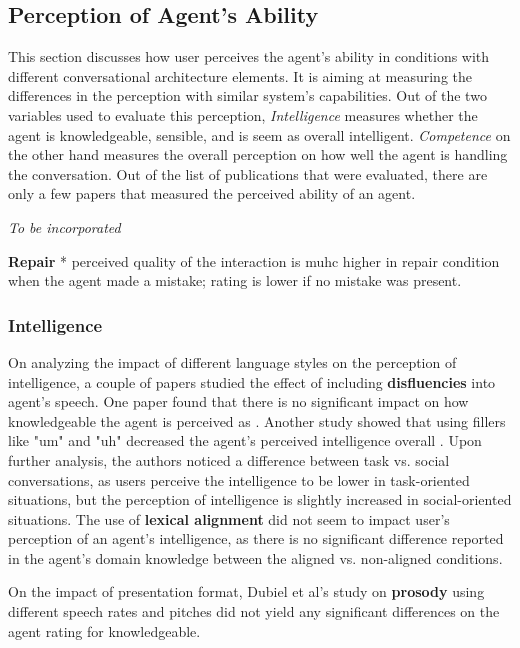 \documentclass[sigconf,screen,review, anonymous]{acmart}
\newcommand{\cmt}[1]{}%
\begin{document}
\subsection{Perception of Agent's Ability}

This section discusses how user perceives the agent's ability in conditions with different conversational architecture elements. It is aiming at measuring the differences in the perception with similar system's capabilities. Out of the two variables used to evaluate this perception, \textit{Intelligence} measures whether the agent is knowledgeable, sensible, and is seem as overall intelligent. \textit{Competence} on the other hand measures the overall perception on how well the agent is handling the conversation. Out of the list of publications that were evaluated, there are only a few papers that measured the perceived ability of an agent.

\textit{To be incorporated}

\textbf{Repair}
* perceived quality of the interaction is muhc higher in repair condition when the agent made a mistake; rating is lower if no mistake was present. \cite{cuadra2021my}\cmt{[67]}

\subsubsection{Intelligence}

On analyzing the impact of different language styles on the perception of intelligence, a couple of papers studied the effect of including \textbf{disfluencies} into agent's speech. One paper found that there is no significant impact on how knowledgeable the agent is perceived as \cite{pfeifer2009should}\cmt{[12]}. Another study showed that using fillers like "um" and "uh" decreased the agent's perceived intelligence overall \cite{jeong2019exploring}\cmt{[10]}. Upon further analysis, the authors noticed a difference between task vs. social conversations, as users perceive the intelligence to be lower in task-oriented situations, but the perception of intelligence is slightly increased in social-oriented situations. The use of \textbf{lexical alignment} did not seem to impact user's perception of an agent's intelligence, as there is no significant difference reported in the agent's domain knowledge between the aligned vs. non-aligned conditions.

On the impact of presentation format, Dubiel et al's study on \textbf{prosody} using different speech rates and pitches did not yield any significant differences on the agent rating for knowledgeable.
\end{document}
